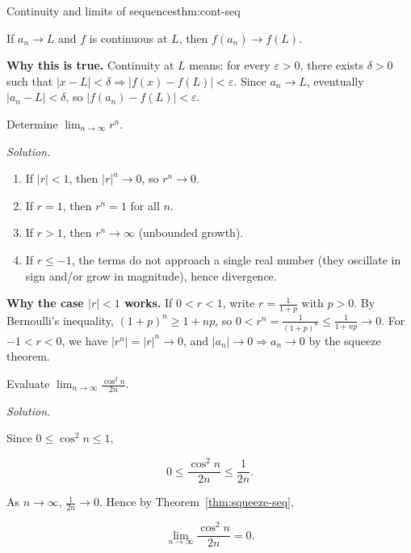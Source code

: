 \begin{theorem}{Continuity and limits of sequences}{thm:cont-seq}

If $a_n\to L$ and $f$ is continuous at $L$, then $f(a_n)\to f(L)$.

\end{theorem}

\noindent
\textbf{Why this is true.}
Continuity at $L$ means: for every $\varepsilon>0$, there exists $\delta>0$ such that $|x-L|<\delta\Rightarrow |f(x)-f(L)|<\varepsilon$.
Since $a_n\to L$, eventually $|a_n-L|<\delta$, so $|f(a_n)-f(L)|<\varepsilon$.

\begin{examplebox}[title={Worked Example: geometric sequence $r^n$}]

Determine $\displaystyle \lim_{n\to\infty} r^n$.

\emph{Solution.}

\begin{enumerate}[label=(\roman*), leftmargin=3em]

\item If $|r|<1$, then $|r|^n\to 0$, so $r^n\to 0$.

\item If $r=1$, then $r^n=1$ for all $n$.

\item If $r>1$, then $r^n\to\infty$ (unbounded growth).

\item If $r\le -1$, the terms do not approach a single real number (they oscillate in sign and/or grow in magnitude), hence divergence.

\end{enumerate}

\end{examplebox}

\noindent
\textbf{Why the case $|r|<1$ works.}
If $0<r<1$, write $r=\frac{1}{1+p}$ with $p>0$. By Bernoulli's inequality, $(1+p)^n\ge 1+np$, so $0<r^n=\frac{1}{(1+p)^n}\le \frac{1}{1+np}\to 0$.
For $-1<r<0$, we have $|r^n|=|r|^n\to 0$, and $|a_n|\to 0\Rightarrow a_n\to 0$ by the squeeze theorem.

\begin{examplebox}[title={Worked Example: a bounded trigonometric factor (Squeeze)}]

Evaluate $\displaystyle \lim_{n\to\infty}\frac{\cos^2 n}{2n}$.

\emph{Solution.}

Since $0\le \cos^2 n\le 1$,

\[
0\le \frac{\cos^2 n}{2n}\le \frac{1}{2n}.
\]

As $n\to\infty$, $\frac{1}{2n}\to 0$. Hence by Theorem~\ref{thm:squeeze-seq},

\[
\boxed{\lim_{n\to\infty}\frac{\cos^2 n}{2n}=0}.
\]

\end{examplebox}

